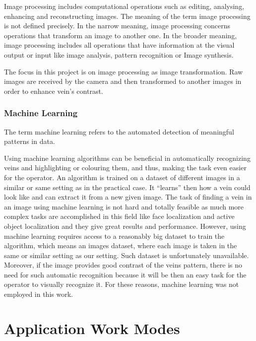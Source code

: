 Image processing includes computational operations such as editing, analysing, enhancing and reconstructing images. 
The meaning of the term image processing is not defined precisely. In the narrow meaning, image processing concerns operations that transform an image to another one. In the broader meaning, image processing includes all operations that have information at the visual output or input like image analysis, pattern recognition or Image synthesis. 

The focus in this project is on image processing as image transformation. Raw images are received by the camera and then transformed to another images in order to enhance vein’s contrast.


\subsubsection{Machine Learning}

The term machine learning refers to the automated detection of meaningful patterns in data\parencite{machineLearning}.

Using machine learning algorithms can be beneficial in automatically recognizing veins and highlighting or colouring them, and thus, making the task even easier for the operator. An algorithm is trained on a dataset of different images in a similar or same setting as in the practical case. It “learns” then how a vein could look like and can extract it from a new given image. The task of finding a vein in an image using machine learning is not hard and totally feasible as much more complex tasks are accomplished in this field like face localization\parencite{faceLocal} and active object localization \parencite{objectLocal} and they give great results and performance. However, using machine learning requires access to a reasonably big dataset to train the algorithm, which means an images dataset, where each image is taken in the same or similar setting as our setting. Such dataset is unfortunately unavailable.
Moreover, if the image provides good contrast of the veins pattern, there is no need for such automatic recognition because it will be then an easy task for the operator to visually recognize it. For these reasons, machine learning was not employed in this work.


\section{Application Work Modes}






